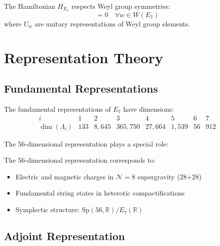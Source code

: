 \begin{proposition}
\label{prop:e7_symmetry_hamiltonian}
The Hamiltonian $H_{E_7}$ respects Weyl group symmetries:
\begin{equation}
[H_{E_7}, U_w] = 0 \quad \forall w \in W(E_7)
\end{equation}
where $U_w$ are unitary representations of Weyl group elements.
\end{proposition}

\section{Representation Theory}

\subsection{Fundamental Representations}

\begin{theorem}
\label{thm:e7_representations}
The fundamental representations of $E_7$ have dimensions:
\begin{equation}
\begin{array}{c|ccccccc}
i & 1 & 2 & 3 & 4 & 5 & 6 & 7 \\
\hline
\dim(\Lambda_i) & 133 & 8,645 & 365,750 & 27,664 & 1,539 & 56 & 912
\end{array}
\end{equation}
\end{theorem}

The 56-dimensional representation plays a special role:

\begin{proposition}[The 56 of E$_7$]
\label{prop:e7_56}
The 56-dimensional representation corresponds to:
\begin{itemize}
    \item Electric and magnetic charges in $\mathcal{N}=8$ supergravity (28+28)
    \item Fundamental string states in heterotic compactifications
    \item Symplectic structure: $\text{Sp}(56, \mathbb{R})/E_7(\mathbb{R})$
\end{itemize}
\end{proposition}

\subsection{Adjoint Representation}

